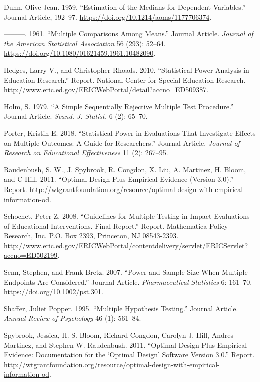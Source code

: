\documentclass[
]{article}
\newlength{\cslhangindent}
\newenvironment{cslreferences}%
  {\setlength{\parindent}{0pt}%
  \everypar{\setlength{\hangindent}{\cslhangindent}}\ignorespaces}%
  {\par}
\begin{document}
\begin{cslreferences}
\leavevmode\hypertarget{ref-RN24280}{}%
Dunn, Olive Jean. 1959. ``Estimation of the Medians for Dependent
Variables.'' Journal Article, 192--97.
\url{https://doi.org/10.1214/aoms/1177706374}.

\leavevmode\hypertarget{ref-RN24281}{}%
---------. 1961. ``Multiple Comparisons Among Means.'' Journal Article.
\emph{Journal of the American Statistical Association} 56 (293): 52--64.
\url{https://doi.org/10.1080/01621459.1961.10482090}.

\leavevmode\hypertarget{ref-RN30153}{}%
Hedges, Larry V., and Christopher Rhoads. 2010. ``Statistical Power
Analysis in Education Research.'' Report. National Center for Special
Education Research.
\url{http://www.eric.ed.gov/ERICWebPortal/detail?accno=ED509387}.

\leavevmode\hypertarget{ref-RN24282}{}%
Holm, S. 1979. ``A Simple Sequentially Rejective Multiple Test
Procedure.'' Journal Article. \emph{Scand. J. Statist.} 6 (2): 65--70.

\leavevmode\hypertarget{ref-Porter2018}{}%
Porter, Kristin E. 2018. ``Statistical Power in Evaluations That
Investigate Effects on Multiple Outcomes: A Guide for Researchers.''
Journal Article. \emph{Journal of Research on Educational Effectiveness}
11 (2): 267--95.

\leavevmode\hypertarget{ref-RN23884}{}%
Raudenbush, S. W., J. Spybrook, R. Congdon, X. Liu, A. Martinez, H.
Bloom, and C Hill. 2011. ``Optimal Design Plus Empirical Evidence
(Version 3.0).'' Report.
\url{http://wtgrantfoundation.org/resource/optimal-design-with-empirical-information-od}.

\leavevmode\hypertarget{ref-RN23748}{}%
Schochet, Peter Z. 2008. ``Guidelines for Multiple Testing in Impact
Evaluations of Educational Interventions. Final Report.'' Report.
Mathematica Policy Research, Inc. P.O. Box 2393, Princeton, NJ
08543-2393.
\url{http://www.eric.ed.gov/ERICWebPortal/contentdelivery/servlet/ERICServlet?accno=ED502199}.

\leavevmode\hypertarget{ref-RN23881}{}%
Senn, Stephen, and Frank Bretz. 2007. ``Power and Sample Size When
Multiple Endpoints Are Considered.'' Journal Article.
\emph{Pharmaceutical Statistics} 6: 161--70.
\url{https://doi.org/10.1002/pst.301}.

\leavevmode\hypertarget{ref-RN352}{}%
Shaffer, Juliet Popper. 1995. ``Multiple Hypothesis Testing.'' Journal
Article. \emph{Annual Review of Psychology} 46 (1): 561--84.

\leavevmode\hypertarget{ref-RN24179}{}%
Spybrook, Jessica, H. S. Bloom, Richard Congdon, Carolyn J. Hill, Andres
Martinez, and Stephen W. Raudenbush. 2011. ``Optimal Design Plus
Empirical Evidence: Documentation for the `Optimal Design' Software
Version 3.0.'' Report.
\url{http://wtgrantfoundation.org/resource/optimal-design-with-empirical-information-od}.


\end{cslreferences}
\end{document}
